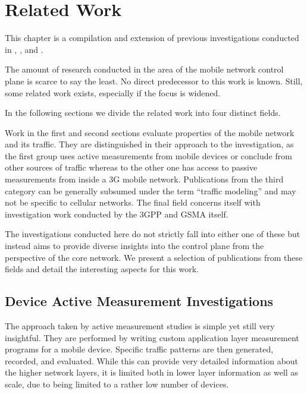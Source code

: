 \section{Related Work}
\label{c4:relwork}


This chapter is a compilation and extension of previous investigations conducted in \cite{metzger2012research}, \cite{metzger2014jcnc}, and \cite{metzger2014lossmodel}. 

The amount of research conducted in the area of the mobile network control plane is scarce to say the least. No direct predecessor to this work is known. Still, some related work exists, especially if the focus is widened.

In the following sections we divide the related work into four distinct fields.

Work in the first and second sections evaluate properties of the mobile network and its traffic. They are distinguished in their approach to the investigation, as the first group uses active measurements from mobile devices or conclude from other sources of traffic whereas to the other one has access to passive measurements from inside a \gls{3G} mobile network. Publications from the third category can be generally subsumed under the term ``traffic modeling'' and may not be specific to cellular networks. The final field concerns itself with investigation work conducted by the \gls{3GPP} and \gls{GSMA} itself.

The investigations conducted here do not strictly fall into either one of these but instead aims to provide diverse insights into the control plane from the perspective of the core network. We present a selection of publications from these fields and detail the interesting aspects for this work.


\subsection{Device Active Measurement Investigations}

The approach taken by active measurement studies is simple yet still very insightful. They are performed by writing custom application layer measurement programs for a mobile device. Specific traffic patterns are then generated, recorded, and evaluated. While this can provide very detailed information about the higher network layers, it is limited both in lower layer information as well as scale, due to being limited to a rather low number of devices.

